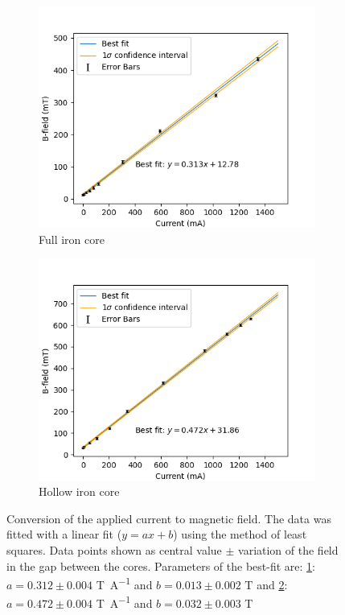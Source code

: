 \documentclass[11pt]{article}
\begin{document}
\begin{figure}
  \centering
  \begin{subfigure}{0.48\linewidth}
    \includegraphics[width=\linewidth]{IvsB full.png}
    \caption{Full iron core}
    \label{fig:IvsB full}
  \end{subfigure}
  \hfill
  \begin{subfigure}{0.48\linewidth}
    \includegraphics[width=\linewidth]{IvsB hollow.png}
    \caption{Hollow iron core}
    \label{fig:IvsB hollow}
  \end{subfigure}
  \captionsetup{justification=centering}
  \caption{Conversion of the applied current to magnetic field.  The data was fitted with a linear fit ($y = a x + b$) using the method of least squares. Data points shown as central value $\pm$ variation of the field in the gap between the cores. Parameters of the best-fit are: \ref{fig:IvsB full}: $a = 0.312 \pm 0.004 $ \si{T.A^{-1}} and $ b = 0.013 \pm 0.002 $ \si{T} and \ref{fig:IvsB hollow}: $a = 0.472 \pm 0.004 $ \si{T.A^{-1}} and $ b = 0.032 \pm 0.003 $ \si{T}}
  \label{fig:IvsB}
\end{figure}
\end{document}
